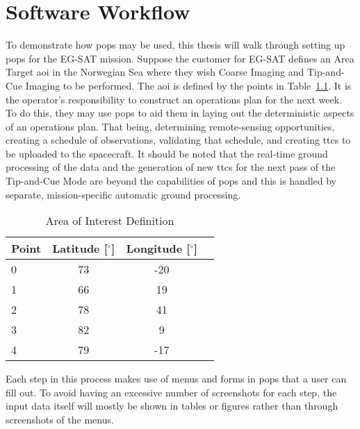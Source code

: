 \glsresetall{} 


\chapter{Software Workflow}\label{chap:workflow}


To demonstrate how \gls{pops} may be used, this thesis will walk through
setting up \gls{pops} for the EG-SAT mission. Suppose the customer for EG-SAT
defines an Area Target \gls{aoi} in the Norwegian Sea where they wish Coarse
Imaging and Tip-and-Cue Imaging to be performed. The \gls{aoi} is defined by
the points  in Table~\ref{tab:norway-aoi}. It is the operator’s responsibility
to construct an operations plan for the next week. To do this, they may use
\gls{pops} to aid them in laying out the deterministic aspects of an operations
plan.  That being, determining remote-sensing opportunities, creating a
schedule of observations, validating that schedule, and creating \glspl{ttc} to
be uploaded to the spacecraft. It should be noted that the real-time ground
processing of the data and the generation of new \glspl{ttc} for the next pass
of the Tip-and-Cue Mode are beyond the capabilities of \gls{pops} and this is
handled by separate, mission-specific automatic ground processing.

\begin{table}[h] 
    \centering
    \caption{Area of Interest Definition}
    \begin{tabular}{cccc}
	Point                  & Latitude [$^\circ$] & Longitude [$^\circ$]  \\ \hline
	\multicolumn{1}{l|}{0} & 73       & -20       \\
	\multicolumn{1}{l|}{1} & 66       & 19        \\
	\multicolumn{1}{l|}{2} & 78       & 41        \\
	\multicolumn{1}{l|}{3} & 82       & 9         \\
	\multicolumn{1}{l|}{4} & 79       & -17      
    \end{tabular}
    \label{tab:norway-aoi}
\end{table}

Each step in this process makes use of menus and forms in \gls{pops} that a
user can fill out. To avoid having an excessive number of screenshots for each
step, the input data itself will mostly be shown in tables or figures rather than
through screenshots of the menus.

